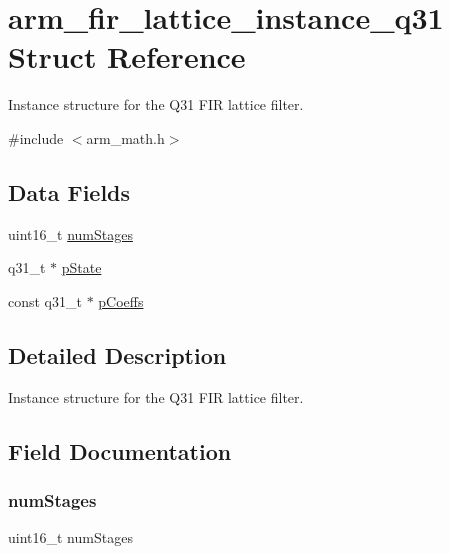 \hypertarget{structarm__fir__lattice__instance__q31}{}\section{arm\+\_\+fir\+\_\+lattice\+\_\+instance\+\_\+q31 Struct Reference}
\label{structarm__fir__lattice__instance__q31}


Instance structure for the Q31 F\+IR lattice filter.  




{\ttfamily \#include $<$arm\+\_\+math.\+h$>$}

\subsection*{Data Fields}
\begin{DoxyCompactItemize}
\item 
uint16\+\_\+t \mbox{\hyperlink{structarm__fir__lattice__instance__q31_a4cceb90547b3e585d4c7aabaa8057212}{num\+Stages}}
\item 
q31\+\_\+t $\ast$ \mbox{\hyperlink{structarm__fir__lattice__instance__q31_adee4ba3ee8869865af7d8fa08ca913d6}{p\+State}}
\item 
const q31\+\_\+t $\ast$ \mbox{\hyperlink{structarm__fir__lattice__instance__q31_a80e7fdf4747dbda8eadb2663fb4be317}{p\+Coeffs}}
\end{DoxyCompactItemize}


\subsection{Detailed Description}
Instance structure for the Q31 F\+IR lattice filter. 

\subsection{Field Documentation}
\mbox{\label{structarm__fir__lattice__instance__q31_a4cceb90547b3e585d4c7aabaa8057212}} 
\subsubsection{\texorpdfstring{numStages}{numStages}}
{\footnotesize\ttfamily uint16\+\_\+t num\+Stages}

